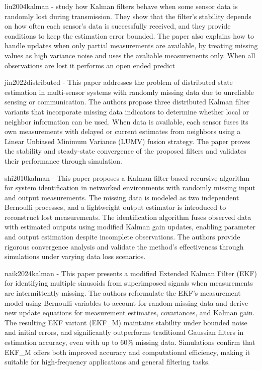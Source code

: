 
liu2004kalman - study how Kalman filters behave when some sensor data is randomly lost during transmission. They show that the filter's stability depends on how often each sensor’s data is successfully received, and they provide conditions to keep the estimation error bounded. The paper also explains how to handle updates when only partial measurements are available, by treating missing values as high variance noise and uses the avaliable measurements only. When all observations are lost it performs an open ended predict

jin2022distributed - This paper addresses the problem of distributed state estimation in multi-sensor systems with randomly missing data due to unreliable sensing or communication. The authors propose three distributed Kalman filter variants that incorporate missing data indicators to determine whether local or neighbor information can be used. When data is available, each sensor fuses its own measurements with delayed or current estimates from neighbors using a Linear Unbiased Minimum Variance (LUMV) fusion strategy. The paper proves the stability and steady-state convergence of the proposed filters and validates their performance through simulation.

shi2010kalman - This paper proposes a Kalman filter-based recursive algorithm for system identification in networked environments with randomly missing input and output measurements. The missing data is modeled as two independent Bernoulli processes, and a lightweight output estimator is introduced to reconstruct lost measurements. The identification algorithm fuses observed data with estimated outputs using modified Kalman gain updates, enabling parameter and output estimation despite incomplete observations. The authors provide rigorous convergence analysis and validate the method’s effectiveness through simulations under varying data loss scenarios.

naik2024kalman - This paper presents a modified Extended Kalman Filter (EKF) for identifying multiple sinusoids from superimposed signals when measurements are intermittently missing. The authors reformulate the EKF's measurement model using Bernoulli variables to account for random missing data and derive new update equations for measurement estimates, covariances, and Kalman gain. The resulting EKF variant (EKF_M) maintains stability under bounded noise and initial errors, and significantly outperforms traditional Gaussian filters in estimation accuracy, even with up to 60\% missing data. Simulations confirm that EKF_M offers both improved accuracy and computational efficiency, making it suitable for high-frequency applications and general filtering tasks.

